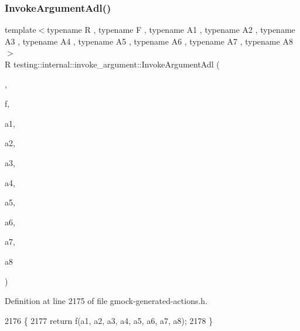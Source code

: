 \subsubsection{\texorpdfstring{Invoke\+Argument\+Adl()}{InvokeArgumentAdl()}\hspace{0.1cm}{\footnotesize\ttfamily [9/11]}}
{\footnotesize\ttfamily template$<$typename R , typename F , typename A1 , typename A2 , typename A3 , typename A4 , typename A5 , typename A6 , typename A7 , typename A8 $>$ \\
R testing\+::internal\+::invoke\+\_\+argument\+::\+Invoke\+Argument\+Adl (\begin{DoxyParamCaption}\item[{\hyperlink{structtesting_1_1internal_1_1invoke__argument_1_1AdlTag}{Adl\+Tag}}]{,  }\item[{F}]{f,  }\item[{A1}]{a1,  }\item[{A2}]{a2,  }\item[{A3}]{a3,  }\item[{A4}]{a4,  }\item[{A5}]{a5,  }\item[{A6}]{a6,  }\item[{A7}]{a7,  }\item[{A8}]{a8 }\end{DoxyParamCaption})}



Definition at line 2175 of file gmock-\/generated-\/actions.\+h.


\begin{DoxyCode}
2176                   \{
2177   \textcolor{keywordflow}{return} f(a1, a2, a3, a4, a5, a6, a7, a8);
2178 \}
\end{DoxyCode}
\mbox{\label{namespacetesting_1_1internal_1_1invoke__argument_a6e204965286414aac5113286eb5c8996}} 
